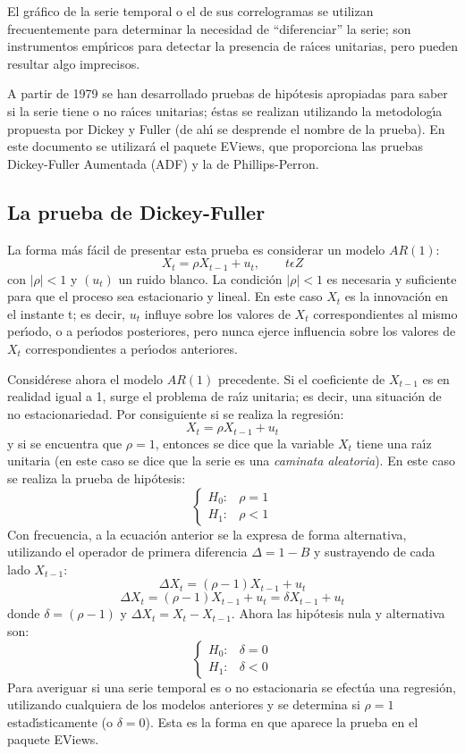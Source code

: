 El gr\'{a}fico de la serie temporal o el de sus correlogramas se utilizan 
frecuentemente para determinar la necesidad de ``diferenciar'' la serie; son 
instrumentos emp\'{\i}ricos para detectar la presencia de ra\'{\i}ces 
unitarias, pero pueden resultar algo imprecisos.

A partir de 1979 se han desarrollado pruebas de hip\'{o}tesis apropiadas 
para saber si la serie tiene o no ra\'{\i}ces unitarias; \'{e}stas se 
realizan utilizando la metodolog\'{\i}a propuesta por Dickey y Fuller (de 
ah\'{\i} se desprende el nombre de la prueba). En este documento se 
utilizar\'{a} el paquete EViews, que proporciona las pruebas Dickey-Fuller 
Aumentada (ADF) y la de Phillips-Perron.

\subsection{La prueba de Dickey-Fuller}

La forma m\'{a}s f\'{a}cil de presentar esta prueba es considerar un modelo $AR(1)$:
\[
X_{t}=\rho X_{t-1}+u_{t},\qquad        
t  \epsilon   Z
\]
con $\left| \rho \right|<1$ y $(u_{t})$ un ruido blanco. La condici\'{o}n 
$\left| \rho \right|<1$ es necesaria y suficiente para que el proceso sea 
estacionario y lineal. En este caso $X_{t}$ es la innovaci\'{o}n en el 
instante t; es decir, $u_{t}$ influye sobre los valores de $X_{t}$ 
correspondientes al mismo per\'{\i}odo, o a per\'{\i}odos posteriores, pero 
nunca ejerce influencia sobre los valores de $X_{t}$ correspondientes a 
per\'{\i}odos anteriores.

Consid\'{e}rese ahora el modelo $AR(1)$ precedente. Si el coeficiente de 
$X_{t-1}$ es en realidad igual a 1, surge el problema de ra\'{\i}z unitaria; 
es decir, una situaci\'{o}n de no estacionariedad. Por consiguiente si se 
realiza la regresi\'{o}n:
\[
X_{t}=\rho X_{t-1}+u_{t}
\]
y si se encuentra que $\rho =1$, entonces se dice que la variable $X_{t}$ 
tiene una ra\'{\i}z unitaria (en este caso se dice que la serie es una 
\emph{caminata aleatoria}). En este 
caso se realiza la prueba de hip\'{o}tesis:
\[
\begin{cases}
H_{0}:&\rho =1 \\ 
H_{1}:&\rho <1
\end{cases}
\]
Con frecuencia, a la ecuaci\'{o}n anterior se la expresa de forma alternativa, utilizando el operador de primera diferencia $\Delta =1-B$ y sustrayendo de cada lado $X_{t-1}$:
\[
{\Delta }X_{t}=\left( \rho -1 \right)X_{t-1}+u_{t}
\]
\[
{\Delta }X_{t}=\left( \rho -1 \right)X_{t-1}+u_{t}=\delta 
X_{t-1}+u_{t}
\]
donde $\delta =(\rho -1)$ y ${\Delta }X_{t}=X_{t}-X_{t-1}$. Ahora las 
hip\'{o}tesis nula y alternativa son: 
\[
\begin{cases}
 H_{0}:&\delta =0 \\ 
 H_{1}:&\delta <0 
\end{cases}
\]
Para averiguar si una serie temporal es o no estacionaria se efect\'{u}a una 
regresi\'{o}n, utilizando cualquiera de los modelos anteriores y se 
determina si $\rho =1$ estad\'{\i}sticamente (o  $\delta =0$). Esta 
es la forma en que aparece la prueba en el paquete EViews. 


